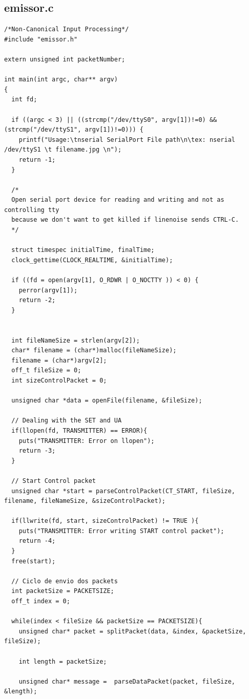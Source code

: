 \documentclass[11pt]{article}
\begin{document}
\pagebreak

\subsection{emissor.c}

\begin{lstlisting}[style=CStyle]
/*Non-Canonical Input Processing*/
#include "emissor.h"

extern unsigned int packetNumber;

int main(int argc, char** argv)
{
  int fd;

  if ((argc < 3) || ((strcmp("/dev/ttyS0", argv[1])!=0) && (strcmp("/dev/ttyS1", argv[1])!=0))) {
    printf("Usage:\tnserial SerialPort File path\n\tex: nserial /dev/ttyS1 \t filename.jpg \n");
    return -1;
  }

  /*
  Open serial port device for reading and writing and not as controlling tty
  because we don't want to get killed if linenoise sends CTRL-C.
  */
  
  struct timespec initialTime, finalTime;
  clock_gettime(CLOCK_REALTIME, &initialTime);

  if ((fd = open(argv[1], O_RDWR | O_NOCTTY )) < 0) {
    perror(argv[1]);
    return -2;
  }


  int fileNameSize = strlen(argv[2]);
  char* filename = (char*)malloc(fileNameSize);
  filename = (char*)argv[2];
  off_t fileSize = 0;
  int sizeControlPacket = 0;

  unsigned char *data = openFile(filename, &fileSize);

  // Dealing with the SET and UA
  if(llopen(fd, TRANSMITTER) == ERROR){
    puts("TRANSMITTER: Error on llopen");
    return -3;
  }

  // Start Control packet
  unsigned char *start = parseControlPacket(CT_START, fileSize, filename, fileNameSize, &sizeControlPacket);

  if(llwrite(fd, start, sizeControlPacket) != TRUE ){
    puts("TRANSMITTER: Error writing START control packet");
    return -4;
  }
  free(start);

  // Ciclo de envio dos packets
  int packetSize = PACKETSIZE;
  off_t index = 0;

  while(index < fileSize && packetSize == PACKETSIZE){
    unsigned char* packet = splitPacket(data, &index, &packetSize, fileSize);

    int length = packetSize;
    
    unsigned char* message =  parseDataPacket(packet, fileSize, &length);


\end{lstlisting}
\end{document}
